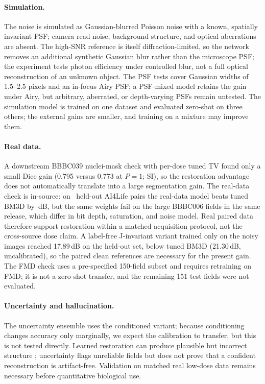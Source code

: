 \documentclass[preprint,12pt]{elsarticle}
\begin{document}
\paragraph{Simulation.}
The noise is simulated as Gaussian-blurred Poisson noise with a known,
spatially invariant PSF; camera read noise, background structure, and optical
aberrations are absent. The high-SNR reference is itself diffraction-limited,
so the network removes an additional synthetic Gaussian blur rather than the
microscope PSF; the experiment tests photon efficiency under controlled blur,
not a full optical reconstruction of an unknown object. The PSF tests cover
Gaussian widths of 1.5--2.5 pixels and an in-focus Airy PSF; a PSF-mixed model
retains the gain under Airy, but arbitrary, aberrated, or depth-varying PSFs
remain untested. The simulation model is trained on one dataset and evaluated
zero-shot on three others; the external gains are smaller, and training on a
mixture may improve them.

\paragraph{Real data.}
A downstream BBBC039 nuclei-mask check with per-dose tuned TV found only a
small Dice gain (0.795 versus 0.773 at $P=1$; SI), so the restoration advantage
does not automatically translate into a large segmentation gain. The real-data
check is in-source: on \RealN\ held-out AI4Life pairs the real-data model beats
tuned BM3D by \RealGain\,dB, but the same weights fail on the large BBBC006
fields in the same release, which differ in bit depth, saturation, and noise
model. Real paired data therefore support restoration within a matched
acquisition protocol, not the cross-source dose claim. A label-free
J-invariant variant \cite{batson2019noise2self} trained only on the noisy
images reached 17.89\,dB on the held-out set,
below tuned BM3D (21.30\,dB, uncalibrated), so the paired clean references are necessary for
the present gain. The FMD check uses a pre-specified 150-field subset and
requires retraining on FMD; it is not a zero-shot transfer, and the remaining
151 test fields were not evaluated.

\paragraph{Uncertainty and hallucination.}
The uncertainty ensemble uses the conditioned variant; because conditioning
changes accuracy only marginally, we expect the calibration to transfer, but
this is not tested directly. Learned restoration can produce plausible but incorrect structure \cite{blau2018perception}; uncertainty
flags unreliable fields but does not prove that a confident reconstruction is
artifact-free. Validation on matched real low-dose data remains necessary
before quantitative biological use.
\end{document}
